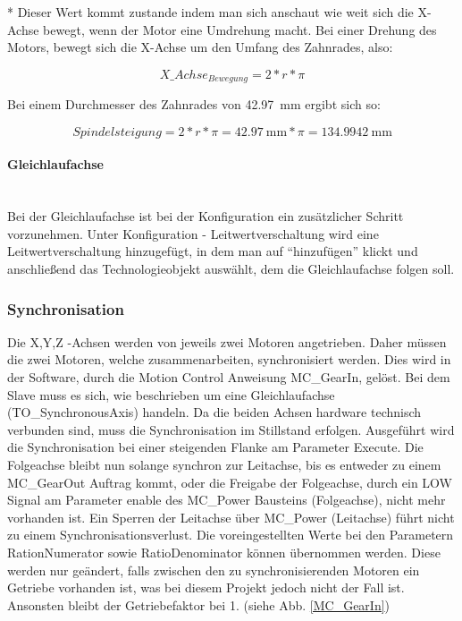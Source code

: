 * Dieser Wert kommt zustande indem man sich anschaut wie weit sich die X-Achse bewegt, wenn der Motor eine Umdrehung macht. Bei einer Drehung des Motors, bewegt sich die X-Achse um den Umfang des Zahnrades, also:

\vspace{-6mm}
        \begin{equation*}
          X\_Achse_{Bewegung} = 2 * r * \pi
        \end{equation*}
        
Bei einem Durchmesser des Zahnrades von \qty{42,97}{\milli\meter} ergibt sich so:

\vspace{-6mm}
        \begin{equation*}
            Spindelsteigung = 2 * r * \pi = \qty{42,97}{\milli\meter}  * \pi = \qty{134,9942}{\milli\meter} 
        \end{equation*}

\paragraph{Gleichlaufachse} \mbox{} \\
Bei der Gleichlaufachse ist bei der Konfiguration ein zusätzlicher Schritt vorzunehmen. Unter Konfiguration - Leitwertverschaltung wird eine Leitwertverschaltung hinzugefügt, in dem man auf \enquote{hinzufügen} klickt und anschließend das Technologieobjekt auswählt, dem die Gleichlaufachse folgen soll.



\subsubsection{Synchronisation}
Die X,Y,Z -Achsen werden von jeweils zwei Motoren angetrieben. Daher müssen die zwei Motoren, welche zusammenarbeiten, synchronisiert werden. Dies wird in der Software, durch die Motion Control Anweisung MC\_GearIn, gelöst. Bei dem Slave muss es sich, wie beschrieben um eine Gleichlaufachse (TO\_SynchronousAxis) handeln. Da die beiden Achsen hardware technisch verbunden sind, muss die Synchronisation im Stillstand erfolgen. Ausgeführt wird die Synchronisation bei einer steigenden Flanke am Parameter Execute. Die Folgeachse bleibt nun solange synchron zur Leitachse, bis es entweder zu einem MC\_GearOut Auftrag kommt, oder die Freigabe der Folgeachse, durch ein LOW Signal am Parameter enable des MC\_Power Bausteins (Folgeachse), nicht mehr vorhanden ist. Ein Sperren der Leitachse über MC\_Power (Leitachse) führt nicht zu einem Synchronisationsverlust. Die voreingestellten Werte bei den Parametern RationNumerator sowie RatioDenominator können übernommen werden. Diese werden nur geändert, falls zwischen den zu synchronisierenden Motoren ein Getriebe vorhanden ist, was bei diesem Projekt jedoch nicht der Fall ist. Ansonsten bleibt der Getriebefaktor bei 1. (siehe Abb. \ref{MC_GearIn})


